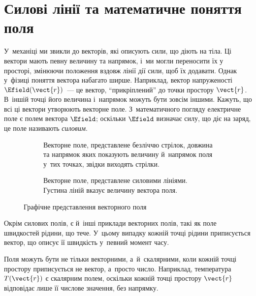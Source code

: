 \section{Силові лінії та математичне поняття поля}\label{sec:FieldLines}\hypertarget{field-lines-concept}{}

У~механіці ми звикли до векторів, які описують сили, що діють на тіла. Ці вектори мають
певну величину та напрямок, і~ми могли переносити їх у просторі, змінюючи положення вздовж
лінії дії сили, щоб їх додавати. Однак у~фізиці поняття вектора набагато ширше. Наприклад,
вектор напруженості $\Efield(\vect{r})$~--- це вектор, \enquote{прикріплений} до точки
простору $\vect{r}$. В~іншій точці його величина і~напрямок можуть бути зовсім іншими.
Кажуть, що всі ці вектори утворюють векторне поле. З~математичного погляду електричне
поле є полем вектора $\Efield$; оскільки $\Efield$ визначає силу, що діє на заряд, це поле
називають \emph{силовим}.

\begin{figure}[h!]\centering
	\begin{subfigure}[t]{0.45\linewidth}
		\centering
		\caption{Векторне поле, представлене безліччю стрілок, довжина та напрямок яких
			показують величину й~напрямок поля у~тих точках, звідки виходять стрілки.}
		\label{tikz:force_vect}
	\end{subfigure}
	\begin{subfigure}[t]{0.45\linewidth}
		\centering
		\caption{Векторне поле, представлене силовими лініями. Густина ліній вказує величину
			вектора поля.}
		\label{tikz:force_line}
	\end{subfigure}
	\caption{Графічне представлення векторного поля}
\end{figure}

Окрім силових полів, є й~інші приклади векторних полів, такі як поле швидкостей рідини, що
тече. У~цьому випадку кожній точці рідини приписується вектор, що описує її швидкість
у~певний момент часу.

Поля можуть бути не тільки векторними, а~й~скалярними, коли кожній точці простору
приписується не вектор, а~просто число. Наприклад, температура $T(\vect{r})$ є скалярним
полем, оскільки кожній точці простору $\vect{r}$ відповідає лише її числове значення, без
напрямку.


